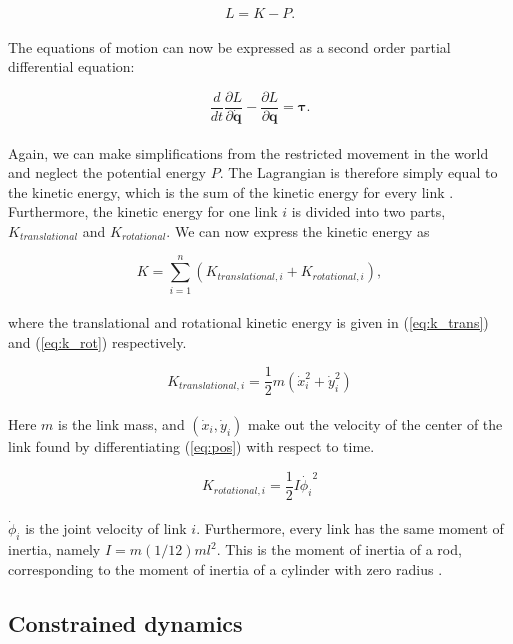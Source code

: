 \begin{equation}
    L = K - P.
\end{equation}
\\
The equations of motion can now be expressed as a second order partial differential equation:

\begin{equation} \label{eq:Lagrange}
    \frac{d}{d t} \frac{\partial L}{\partial \mathbf{\dot{q}}} - \frac{\partial L}{\partial \mathbf{q}} = \boldsymbol{\tau}.
\end{equation}
\\
Again, we can make simplifications from the restricted movement in the world and neglect the potential energy $P$. The Lagrangian is therefore simply equal to the kinetic energy, which is the sum of the kinetic energy for every link \cite{rezapour2014path}. Furthermore, the kinetic energy for one link $i$ is divided into two parts, $K_{translational}$ and $K_{rotational}$.
We can now express the kinetic energy as

\begin{equation}
    K = \sum_{i=1}^{n} (K_{translational,i} + K_{rotational,i}),
\end{equation}
\\
where the translational and rotational kinetic energy is given in (\ref{eq:k_trans}) and (\ref{eq:k_rot}) respectively.

\begin{equation} \label{eq:k_trans}
    K_{translational,i} = \frac{1}{2} m (\dot{x}_i^2 + \dot{y}_i^2)
\end{equation}
\\
Here $m$ is the link mass, and $(\dot{x}_i, \dot{y}_i)$ make out the velocity of the center of the link found by differentiating (\ref{eq:pos}) with respect to time. 

\begin{equation} \label{eq:k_rot}
    K_{rotational,i} = \frac{1}{2}I\dot{\phi_i}^2
\end{equation}
\\
$\dot{\phi}_i$ is the joint velocity of link $i$. Furthermore, every link has the same moment of inertia, namely $I = m (1/12)ml^2$. This is the moment of inertia of a rod, corresponding to the moment of inertia of a cylinder with zero radius \cite{lynch2017modern}.



\subsection{Constrained dynamics}\label{subseq:constr_dyn}

